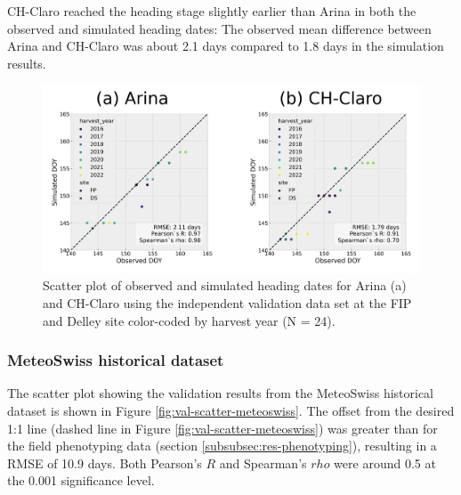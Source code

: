 CH-Claro reached the heading stage slightly earlier than Arina in both the observed and simulated heading dates: The observed mean difference between Arina and CH-Claro was about 2.1 days compared to 1.8 days in the simulation results.

\begin{figure}[H]
    \centering
    \includegraphics[width=\textwidth]{03-Heading-Dates/img/scatter_plot_validation_phenotyping.png}
    \caption{Scatter plot of observed and simulated heading dates for Arina (a) and CH-Claro using the independent validation data set at the FIP and Delley site color-coded by harvest year (N = 24).}
    \label{fig:val-scatter}
\end{figure}

\subsubsection{MeteoSwiss historical dataset}
\label{subsubsec:meteoswiss-data}

The scatter plot showing the validation results from the MeteoSwiss historical dataset is shown in Figure \ref{fig:val-scatter-meteoswiss}. The offset from the desired 1:1 line (dashed line in Figure \ref{fig:val-scatter-meteoswiss}) was greater than for the field phenotyping data (section \ref{subsubsec:res-phenotyping}), resulting in a \gls{RMSE} of 10.9 days. Both Pearson's $R$ and Spearman's $rho$ were around 0.5 at the 0.001 significance level.

